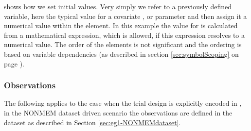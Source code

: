 shows how we set
initial values. Very simply we refer to a previously defined variable,
here the typical value for a covariate , or parameter and then assign
it a numerical value within the  element.
In this example the value for  is
calculated from a mathematical expression, which is allowed, if this expression
resolves to a numerical value.  The order of the 
elements is not significant and the ordering is based on variable
dependencies (as described in section \ref{sec:symbolScoping} on page
\pageref{sec:symbolScoping}).


\subsubsection{Observations}
The following applies to the case when the trial design is explicitly encoded in \pml,
in the NONMEM dataset driven scenario the observations are defined in the dataset
as described in Section \ref{sec:eg1-NONMEMdataset}.

